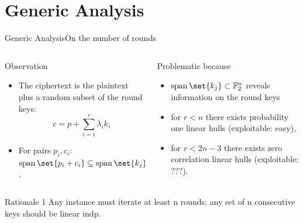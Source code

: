 \section{Generic Analysis}
\begin{frame}{Generic Analysis}{On the number of rounds}
    \begin{columns}
        \begin{column}{0.49\textwidth}
            \begin{block}{Observation}
                \begin{itemize}
                    \item The ciphertext is the plaintext plus a random subset of the round keys:
                        \begin{equation*}
                            c = p + \sum_{i=1}^{r} \lambda_i k_i
                        \end{equation*}
                    \item For pairs $p_i, c_i$: $\Span \set{p_i + c_i} \subseteq \Span \set{k_j}$.
                \end{itemize}
            \end{block}
        \end{column}
        \begin{column}{0.49\textwidth}
            \begin{alertblock}{Problematic because}
                \vspace{1.5pt}
                \begin{itemize}
                    \item $\Span \set{k_j} \subset \F_2^n$ reveals information on the round keys\\[7pt]
                    \item for $r < n$ there exists probability one linear hulls (exploitable: easy),\\[7pt]
                    \item for $r < 2n - 3$ there exists zero correlation linear hulls (exploitable: ???).
                \end{itemize}
                \vspace{1.5pt}
            \end{alertblock}
        \end{column}
    \end{columns}
    \hspace*{-8.5pt}
    \begin{minipage}{1.0145\textwidth}
    \begin{exampleblock}{Rationale 1}
        Any instance must iterate at least n rounds; any set of n consecutive keys should be linear indp.
    \end{exampleblock}
    \end{minipage}
\end{frame}

